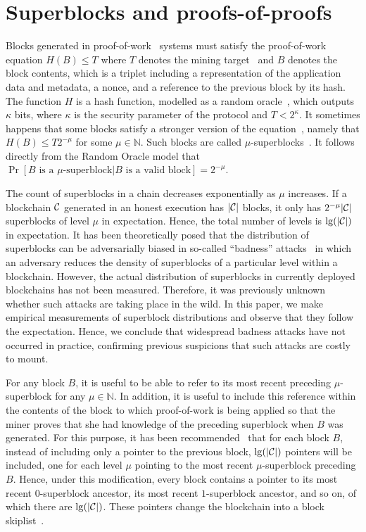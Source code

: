 \section{Superblocks and proofs-of-proofs}

Blocks generated in proof-of-work~\cite{C:DwoNao92} systems must satisfy the
proof-of-work equation $H(B) \leq T$ where $T$ denotes the mining
target~\cite{SP:BMCNKF15} and $B$ denotes the block contents, which is a triplet
including a representation of the application data and metadata, a nonce, and a
reference to the previous block by its hash. The function $H$ is a hash
function, modelled as a random oracle~\cite{CCS:BelRog93}, which outputs
$\kappa$ bits, where $\kappa$ is the security parameter of the protocol and $T <
2^\kappa$. It sometimes happens that some blocks satisfy a stronger version of
the equation~\cite{popow}, namely that $H(B) \leq T2^{-\mu}$ for some $\mu \in
\mathbb{N}$. Such blocks are called $\mu$-superblocks~\cite{nipopows}.
It follows directly from the Random Oracle model that
$\Pr[B \text{ is a } \mu\text{-superblock}|B \text{ is a valid block}] = 2^{-\mu}$.

The count of superblocks in a chain decreases exponentially as $\mu$ increases.
If a blockchain $\mathcal{C}$ generated in an honest execution has $|\mathcal{C}|$ blocks,
it only has $2^{-\mu}|\mathcal{C}|$ superblocks of level $\mu$ in expectation. Hence,
the total number of levels is $\lg(|\mathcal{C}|)$ in expectation. It has been
theoretically posed that the distribution of superblocks can be adversarially
biased in so-called ``badness'' attacks~\cite{nipopows} in which an adversary
reduces the density of superblocks of a particular level within a blockchain.
However, the actual distribution of superblocks in currently deployed
blockchains has not been measured. Therefore, it was previously unknown whether
such attacks are taking place in the wild. In this paper, we make empirical
measurements of superblock distributions and observe that they follow the
expectation. Hence, we conclude that widespread badness attacks have not
occurred in practice, confirming previous suspicions that such attacks are
costly to mount.

For any block $B$,
it is useful to be able to refer to its most recent preceding $\mu$-superblock
for any $\mu \in \mathbb{N}$. In addition, it is useful to include this
reference within the contents of the block to which proof-of-work is being applied
so that the miner proves that she had knowledge of the preceding superblock
when $B$ was generated. For this purpose, it has been
recommended~\cite{nipopows} that for each block $B$, instead of including only a
pointer to the previous block, $\lg(|\mathcal{C}|)$ pointers will be included, one
for each level $\mu$ pointing to the most recent $\mu$-superblock preceding $B$.
Hence, under this modification, every block contains a pointer to its most
recent $0$-superblock ancestor, its most recent $1$-superblock ancestor, and so
on, of which there are $\lg(|\mathcal{C}|)$. These pointers change the blockchain
into a block skiplist~\cite{skiplist,papadakis1993skip}.

